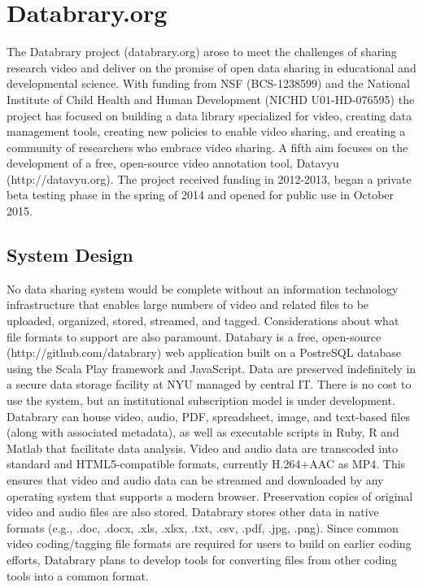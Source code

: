 \documentclass[letterpaper,man,apacite]{apa6}
\begin{document}
\section{Databrary.org}
The Databrary project (databrary.org) arose to meet the challenges of sharing research video and deliver on the promise of open data sharing in educational and developmental science.
With funding from NSF (BCS-1238599) and the National Institute of Child Health and Human Development (NICHD U01-HD-076595) the project has focused on building a data library specialized for video, creating data management tools, creating new policies to enable video sharing, and creating a community of researchers who embrace video sharing.
A fifth aim focuses on the development of a free, open-source video annotation tool, Datavyu (http://datavyu.org).
The project received funding in 2012-2013, began a private beta testing phase in the spring of 2014 and opened for public use in October 2015.

\subsection{System Design}

No data sharing system would be complete without an information technology infrastructure that enables large numbers of video and related files to be uploaded, organized, stored, streamed, and tagged.
Considerations about what file formats to support are also paramount.
Databary is a free, open-source (http://github.com/databrary) web application built on a PostreSQL database using the Scala Play framework and JavaScript.
Data are preserved indefinitely in a secure data storage facility at NYU managed by central IT.
There is no cost to use the system, but an institutional subscription model is under development.
Databrary can house video, audio, PDF, spreadsheet, image, and text-based files (along with associated metadata), as well as executable scripts in Ruby, R and Matlab that facilitate data analysis.
Video and audio data are transcoded into standard and HTML5-compatible formats, currently H.264+AAC as MP4.
This ensures that video and audio data can be streamed and downloaded by any operating system that supports a modern browser.
Preservation copies of original video and audio files are also stored.
Databrary stores other data in native formats (e.g., .doc, .docx, .xls, .xlsx, .txt, .csv, .pdf, .jpg, .png).
Since common video coding/tagging file formats are required for users to build on earlier coding efforts, Databrary plans to develop tools for converting files from other coding tools into a common format.
\end{document}
